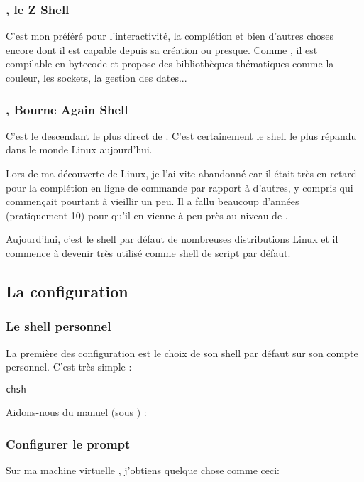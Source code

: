 \subsubsection{\zsh, le Z Shell}
C'est mon préféré pour l'interactivité, la complétion et bien d'autres choses encore dont il est capable depuis sa création ou presque. Comme \ksh, il est compilable en bytecode et propose des bibliothèques thématiques comme la couleur, les sockets, la gestion des dates...

\subsubsection{\bash, Bourne Again Shell}
C'est le descendant le plus direct de \sh. C'est certainement le shell le plus répandu dans le monde Linux aujourd'hui. 

Lors de ma découverte de Linux, je l'ai vite abandonné car il était très en retard pour la complétion en ligne de commande par rapport à d'autres, y compris \tcsh qui commençait pourtant à vieillir un peu. Il a fallu beaucoup d'années (pratiquement 10) pour qu'il en vienne à peu près au niveau de \zsh.

Aujourd'hui, c'est le shell par défaut de nombreuses distributions Linux et il commence à devenir très utilisé comme shell de script par défaut. 

\subsection{La configuration}
\subsubsection{Le shell personnel}
La première des configuration est le choix de son shell par défaut sur son compte personnel. C'est très simple :

\lstset{style=shell}
\begin{lstlisting}
chsh
\end{lstlisting}

Aidons-nous du manuel (sous \netbsd) :


\subsubsection{Configurer le prompt}

Sur ma machine virtuelle \netbsd, j'obtiens quelque chose comme ceci:

